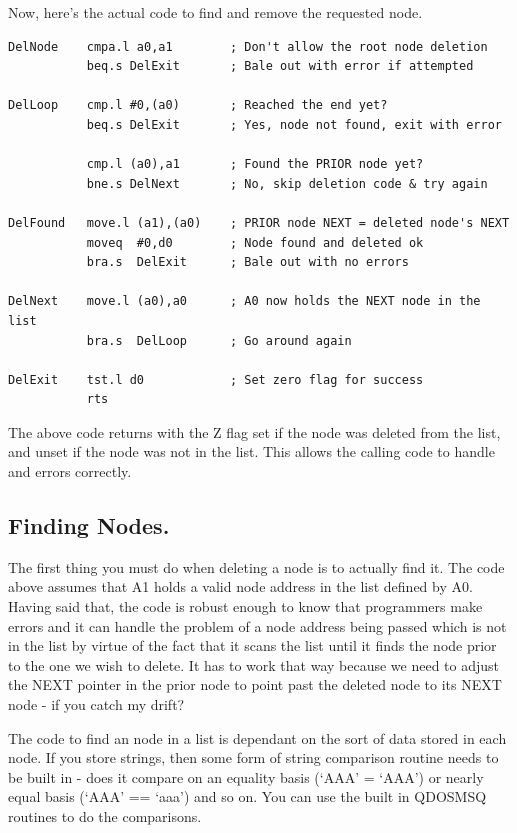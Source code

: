 Now, here's the actual code to find and remove the requested
      node.

\begin{lstlisting}[firstnumber=last,caption={Deleting a Node},label={lst:DeletingANode}]
DelNode    cmpa.l a0,a1        ; Don't allow the root node deletion
           beq.s DelExit       ; Bale out with error if attempted

DelLoop    cmp.l #0,(a0)       ; Reached the end yet?
           beq.s DelExit       ; Yes, node not found, exit with error

           cmp.l (a0),a1       ; Found the PRIOR node yet?
           bne.s DelNext       ; No, skip deletion code & try again

DelFound   move.l (a1),(a0)    ; PRIOR node NEXT = deleted node's NEXT 
           moveq  #0,d0        ; Node found and deleted ok
           bra.s  DelExit      ; Bale out with no errors

DelNext    move.l (a0),a0      ; A0 now holds the NEXT node in the list
           bra.s  DelLoop      ; Go around again

DelExit    tst.l d0            ; Set zero flag for success
           rts
\end{lstlisting}

The above code returns with the Z flag set if the node was deleted
      from the list, and unset if the node was not in the list. This allows
      the calling code to handle and errors correctly.

\subsection{Finding Nodes.}
\label{ch10-finding-nodes}%

The first thing you must do when deleting a node is to actually
      find it. The code above assumes that A1 holds a valid node address in
      the list defined by A0. Having said that, the code is robust enough to
      know that programmers make errors and it can handle the problem of a
      node address being passed which is not in the list by virtue of the fact
      that it scans the list until it finds the node prior to the one we wish
      to delete. It has to work that way because we need to adjust the NEXT
      pointer in the prior node to point past the deleted node to its NEXT
      node -{} if you catch my drift?

The code to find an node in a list is dependant on the sort of
      data stored in each node. If you store strings, then some form of string
      comparison routine needs to be built in -{} does it compare on an equality
      basis (`AAA' = `AAA') or nearly equal basis (`AAA' == `aaa') and so on.
      You can use the built in QDOSMSQ routines to do the comparisons.

